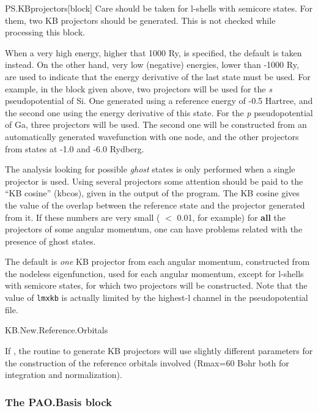 \begin{fdfentry}{PS.KBprojectors}[block]
Care should be taken for l-shells with semicore states. For them, two
KB projectors should be generated. This is not checked while
processing this block.

When a very high energy, higher that 1000 Ry, is specified, the
default is taken instead.  On the other hand, very low (negative)
energies, lower than -1000 Ry, are used to indicate that the energy
derivative of the last state must be used. For example, in the block
given above, two projectors will be used for the \textit{s}
pseudopotential of Si. One generated using a reference energy of -0.5
Hartree, and the second one using the energy derivative of this
state. For the \textit{p} pseudopotential of Ga, three projectors will be
used.  The second one will be constructed from an automatically
generated wavefunction with one node, and the other projectors from
states at -1.0 and -6.0 Rydberg.

The analysis looking for possible \textit{ghost} states is only performed
when a single projector is used.  Using several projectors some
attention should be paid to the ``KB cosine'' (kbcos), given in the
output of the program.  The KB cosine gives the value of the overlap
between the reference state and the projector generated from it.  If
these numbers are very small ( $<$ 0.01, for example) for \textbf{all}
the projectors of some angular momentum, one can have problems related
with the presence of ghost states.

The default is \emph{one} KB projector from each angular momentum,
constructed from the nodeless eigenfunction, used for each angular
momentum, except for l-shells with semicore states, for which two
projectors will be constructed.
Note that the value of \texttt{lmxkb} is actually limited by the
highest-l channel in the pseudopotential file.

\end{fdfentry}  


\begin{fdflogicalF}{KB.New.Reference.Orbitals}

  If \fdftrue, the routine to generate KB projectors will use slightly
  different parameters for the construction of the reference orbitals
  involved (Rmax=60 Bohr both for integration and normalization).
  
\end{fdflogicalF}


\subsubsection{The PAO.Basis block}

